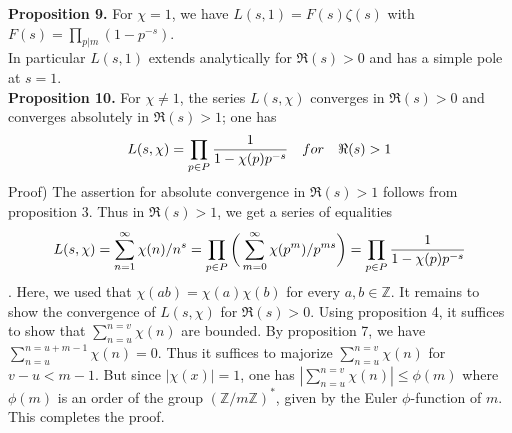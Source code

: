 \documentclass[11pt]{article}
\begin{document}
\noindent \textbf{Proposition 9.}
For $\chi=1$, we have $L(s,1)=F(s)\zeta(s)$ with $F(s)=\displaystyle\prod_{p|m} (1-p^{-s})$. \\ In particular $L(s,1)$ extends analytically for $\Re(s)>0$ and has a simple pole at $s=1$.
\vspace{10mm}
\\
\textbf{Proposition 10.}
For $\chi\neq 1$, the series $L(s,\chi)$ converges in $\Re(s)>0$ and converges absolutely in $\Re(s)>1$; one has
\begin{equation*}
    L(s,\chi)=\displaystyle\prod_{p\in P} {1\over 1-\chi(p)p^{-s}} \quad for \quad \Re(s)>1
\end{equation*}
Proof) The assertion for absolute convergence in $\Re(s)>1$ follows from proposition 3. Thus in $\Re(s)>1$, we get a series of equalities
\begin{equation*}
   L(s,\chi)=\displaystyle\sum_{n=1}^{\infty} \chi(n)/n^s=\displaystyle\prod_{p\in P}\bigg(\displaystyle\sum_{m=0}^{\infty} \chi(p^m)/p^{ms}\bigg)=\displaystyle\prod_{p\in P} {1\over 1-\chi(p)p^{-s}}
\end{equation*}.
Here, we used that $\chi(ab)=\chi(a)\chi(b)$ for every $a,b\in \mathbb{Z}$. It remains to show the convergence of $L(s,\chi)$ for $\Re(s)>0$. Using proposition 4, it suffices to show that $\displaystyle\sum_{n=u}^{n=v} \chi(n)$ are bounded. By proposition 7, we have $\displaystyle\sum_{n=u}^{n=u+m-1} \chi(n)=0$. Thus it suffices to majorize $\displaystyle\sum_{n=u}^{n=v} \chi(n)$ for $v-u<m-1$. But since $|\chi(x)|=1$, one has $|\displaystyle\sum_{n=u}^{n=v} \chi(n)|\leq \phi(m)$ where $\phi(m)$ is an order of the group $(\mathbb{Z}/m\mathbb{Z})^*$, given by the Euler $\phi$-function of $m$. This completes the proof.
\vspace{15mm}
\end{document}
